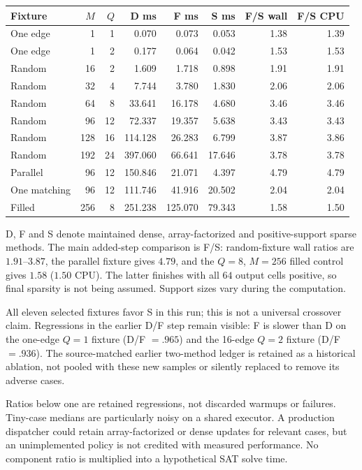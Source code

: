 \documentclass[11pt,letterpaper]{article}
\theoremstyle{remark}\newtheorem{remark}[theorem]{Remark}
\begin{document}
\begin{center}\small
\begin{tabular}{@{}lrrrrrrr@{}}\toprule
Fixture & $M$ & $Q$ & D ms & F ms & S ms & F/S wall & F/S CPU\\\midrule
One edge&1&1&0.070&0.073&0.053&1.38&1.39\\
One edge&1&2&0.177&0.064&0.042&1.53&1.53\\
Random&16&2&1.609&1.718&0.898&1.91&1.91\\
Random&32&4&7.744&3.780&1.830&2.06&2.06\\
Random&64&8&33.641&16.178&4.680&3.46&3.46\\
Random&96&12&72.337&19.357&5.638&3.43&3.43\\
Random&128&16&114.128&26.283&6.799&3.87&3.86\\
Random&192&24&397.060&66.641&17.646&3.78&3.78\\
Parallel&96&12&150.846&21.071&4.397&4.79&4.79\\
One matching&96&12&111.746&41.916&20.502&2.04&2.04\\
Filled&256&8&251.238&125.070&79.343&1.58&1.50\\
\bottomrule\end{tabular}\end{center}
D, F and S denote maintained dense, array-factorized and positive-support sparse methods. The main added-step comparison is F/S: random-fixture wall ratios are $1.91$--$3.87$, the parallel fixture gives $4.79$, and the $Q=8$, $M=256$ filled control gives $1.58$ ($1.50$ CPU). The latter finishes with all $64$ output cells positive, so final sparsity is not being assumed. Support sizes vary during the computation.

All eleven selected fixtures favor S in this run; this is not a universal crossover claim. Regressions in the earlier D/F step remain visible: F is slower than D on the one-edge $Q=1$ fixture (D/F $=.965$) and the 16-edge $Q=2$ fixture (D/F $=.936$). The source-matched earlier two-method ledger is retained as a historical ablation, not pooled with these new samples or silently replaced to remove its adverse cases.

Ratios below one are retained regressions, not discarded warmups or failures. Tiny-case medians are particularly noisy on a shared executor. A production dispatcher could retain array-factorized or dense updates for relevant cases, but an unimplemented policy is not credited with measured performance. No component ratio is multiplied into a hypothetical SAT solve time.
\end{document}
